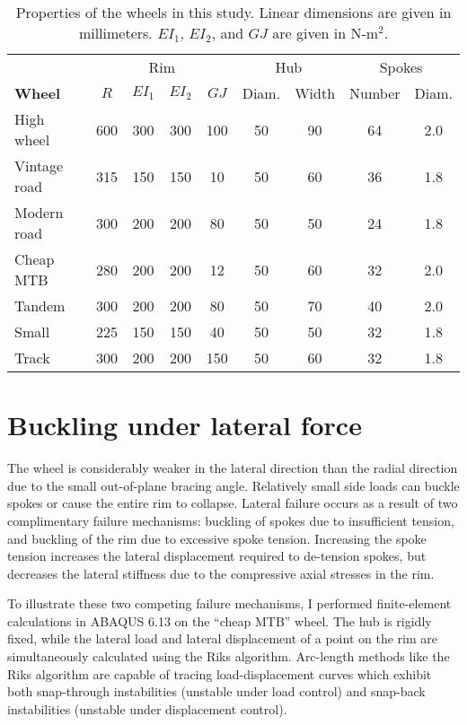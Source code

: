\documentclass[\rootdir/thesis.tex]{subfiles}
\begin{document}
\begin{table}
\caption{Properties of the wheels in this study. Linear dimensions are given in millimeters. $EI_1$, $EI_2$, and $GJ$ are given in N-m$^2$.}
\label{tab:buckling_ext_wheel_props}
\begin{tabular}{l|cccc|cc|cc}
\hline
&\multicolumn{4}{c|}{Rim} & \multicolumn{2}{c|}{Hub} & \multicolumn{2}{c}{Spokes}\\
\bf{Wheel} & $R$ & $EI_1$ & $EI_2$ & $GJ$ & Diam. & Width & Number & Diam.\\
\hline
High wheel   & 600 & 300 & 300 & 100 & 50 & 90 & 64 & 2.0\\
Vintage road & 315 & 150 & 150 & 10  & 50 & 60 & 36 & 1.8\\
Modern road  & 300 & 200 & 200 & 80  & 50 & 50 & 24 & 1.8\\
Cheap MTB    & 280 & 200 & 200 & 12  & 50 & 60 & 32 & 2.0\\
Tandem       & 300 & 200 & 200 & 80  & 50 & 70 & 40 & 2.0\\
Small        & 225 & 150 & 150 & 40  & 50 & 50 & 32 & 1.8\\
Track        & 300 & 200 & 200 & 150 & 50 & 60 & 32 & 1.8\\
\hline
\end{tabular}
\end{table}


\section{Buckling under lateral force}

The wheel is considerably weaker in the lateral direction than the radial direction due to the small out-of-plane bracing angle. Relatively small side loads can buckle spokes or cause the entire rim to collapse. Lateral failure occurs as a result of two complimentary failure mechanisms: buckling of spokes due to insufficient tension, and buckling of the rim due to excessive spoke tension. Increasing the spoke tension increases the lateral displacement required to de-tension spokes, but decreases the lateral stiffness due to the compressive axial stresses in the rim.

To illustrate these two competing failure mechanisms, I performed finite-element calculations in ABAQUS 6.13 on the ``cheap MTB'' wheel. The hub is rigidly fixed, while the lateral load and lateral displacement of a point on the rim are simultaneously calculated using the Riks algorithm. Arc-length methods like the Riks algorithm are capable of tracing load-displacement curves which exhibit both snap-through instabilities (unstable under load control) and snap-back instabilities (unstable under displacement control).
\end{document}
